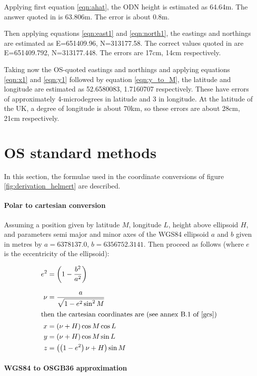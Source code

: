 \documentclass[10pt,a4paper]{article}
\begin{document}
Applying first equation \eqref{eqn:ahat}, the ODN height is estimated as
64.64m.  The answer quoted in \cite{toug} is 63.806m.  The error is about 0.8m.

Then applying equations \eqref{eqn:east1} and \eqref{eqn:north1}, the eastings
and northings are estimated as E=651409.96, N=313177.58.  The correct values
quoted in \cite{toug} are E=651409.792, N=313177.448.  The errors are 17cm,
14cm respectively.

Taking now the OS-quoted eastings and northings and applying equations
\eqref{eqn:x1} and \eqref{eqn:y1} followed by equation \eqref{eqn:y_to_M}, the
latitude and longitude are estimated as 52.6580083,  1.7160707
respectively.  These have errors of approximately 4-microdegrees in latitude and
3 in longitude.  At the latitude of the UK, a degree of longitude is about
70km, so these errors are about 28cm, 21cm respectively.

\section {OS standard methods}
\label{sec:os_models}

In this section, the formulae used in the coordinate conversions of figure
\ref{fig:derivation_helmert} are described.

\paragraph{Polar to cartesian conversion}
\label{sec:polar_to_cart}
Assuming a position given by latitude $M$, longitude $L$, height above
ellipsoid $H$, and parameters semi major and minor axes of the WGS84 ellipsoid
$a$ and $b$ given in metres by $a = 6378137.0$, $b = 6356752.3141$.  Then proceed as follows (where $e$ is the eccentricity of the ellipsoid):

\begin{align}
  e^2 & = \left(1 - \dfrac{b^2}{a^2}\right) \\[2ex]
  \nu & = \frac{a}{\sqrt{1 - e^2 \sin^2{M}}} \\
  \intertext{then the cartesian coordinates are (see annex B.1 of \cite{gcs})}
x & = (\nu + H) \cos{M} \cos{L}
\label{eqn:ptoc_x} \\
y & = (\nu + H) \cos{M} \sin{L} \\
z & = \left(\left(1 - e^2\right)\nu + H\right)\sin{M}
\label{eqn:ptoc_z}
\end{align}

\paragraph{WGS84 to OSGB36 approximation}
\end{document}
